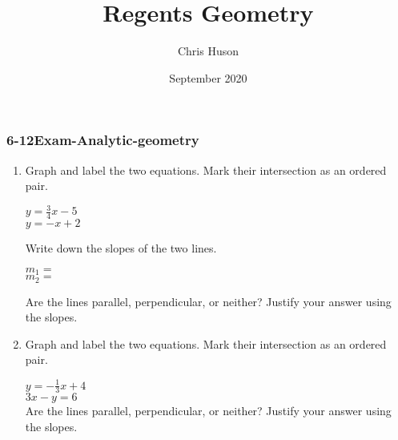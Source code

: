 \documentclass[12pt, twoside]{article}
\title{Regents Geometry}
\author{Chris Huson}
\date{September 2020}
\begin{document}
\subsubsection*{6-12Exam-Analytic-geometry}
\begin{enumerate}
\item Graph and label the two equations. Mark their intersection as an ordered pair.
    \begin{multicols}{2}
      $y =\frac{3}{4}x-5$ \\
      $y=-x+2$
    \end{multicols}     \vspace{0.1cm}
    Write down the slopes of the two lines.
    \begin{multicols}{2}
      $m_1=$ \\
      $m_2=$
    \end{multicols}     \vspace{0.1cm}
    Are the lines parallel, perpendicular, or neither? Justify your answer using the slopes.
    \vspace{3cm}
    \begin{center}
    \end{center}

\newpage
\item Graph and label the two equations. Mark their intersection as an ordered pair.
      \begin{multicols}{2}
        $y =-\frac{1}{3}x+4$ \\[0.25cm]
        $3x-y=6$ \\
        Are the lines parallel, perpendicular, or neither? Justify your answer using the slopes.
      \end{multicols}     \vspace{0.1cm}
      \vspace{1cm}
      \begin{flushright} %
      \end{flushright}


\end{enumerate}
\end{document}
